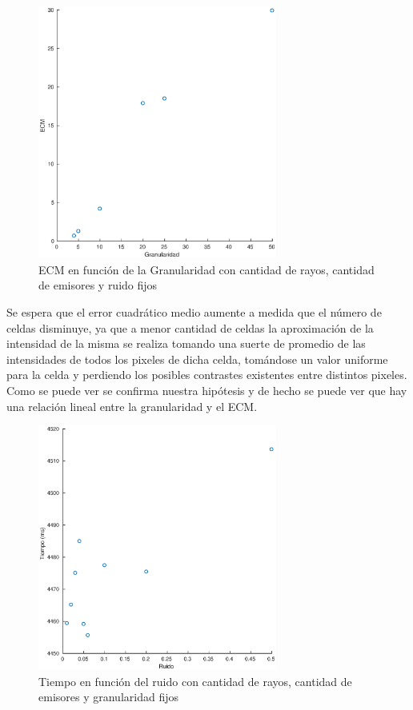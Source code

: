 \begin{figure}[H]
	\centering	\includegraphics[width=0.7\textwidth]{img/granu_ecm}
	\caption{ECM en función de la Granularidad con cantidad de rayos, cantidad de emisores y ruido fijos}
	\label{fig:granu_ecm}
\end{figure}
Se espera que el error cuadrático medio aumente a medida que el número de celdas disminuye, ya que a menor cantidad de celdas la aproximación de la intensidad de la misma se realiza tomando una suerte de promedio de las intensidades de todos los pixeles de dicha celda, tomándose un valor uniforme para la celda y perdiendo los posibles contrastes existentes entre distintos pixeles. Como se puede ver se confirma nuestra hipótesis y de hecho se puede ver que hay una relación lineal entre la granularidad y el ECM.

\begin{figure}[H]
	\centering	\includegraphics[width=0.7\textwidth]{img/ruido_tiempo}
	\caption{Tiempo en función del ruido con cantidad de rayos, cantidad de emisores y granularidad fijos}
	\label{fig:ruido_tiempo}
\end{figure}

